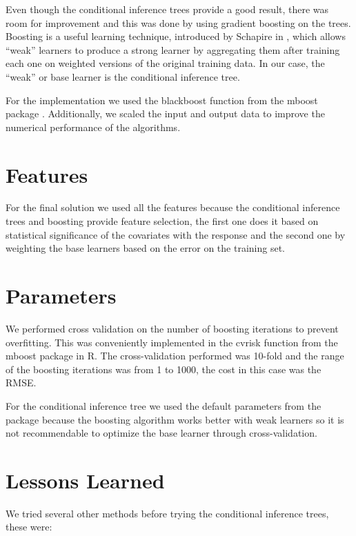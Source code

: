 \documentclass[a4paper, 11pt]{article}
\begin{document}
Even though the conditional inference trees provide a good result, there was room for improvement and this was done by using gradient boosting on the trees. Boosting is a useful learning technique, introduced by Schapire in \cite{Schapire:1990:SWL:83637.83645}, which allows ``weak'' learners to produce a strong learner by aggregating them after training each one on weighted versions of the original training data. In our case, the ``weak'' or base learner is the conditional inference tree. 

For the implementation we used the blackboost function from the mboost package \cite{Buehlmann:2008:StatSci}. Additionally, we scaled the input and output data to improve the numerical performance of the algorithms.

\section{Features}
For the final solution we used all the features because the conditional inference trees and boosting provide feature selection, the first one does it based on statistical significance of the covariates with the response and the second one by weighting the base learners based on the error on the training set.

\section{Parameters}
We performed cross validation on the number of boosting iterations to prevent overfitting. This was conveniently implemented in the cvrisk function from the mboost package in R. The cross-validation performed was 10-fold and the range of the boosting iterations was from 1 to 1000, the cost in this case was the RMSE. 

For the conditional inference tree we used the default parameters from the package because the boosting algorithm works better with weak learners \cite{Freund+Schapire:1996} so it is not recommendable to optimize the base learner through cross-validation.

\section{Lessons Learned}
We tried several other methods before trying the conditional inference trees, these were:
\end{document}
